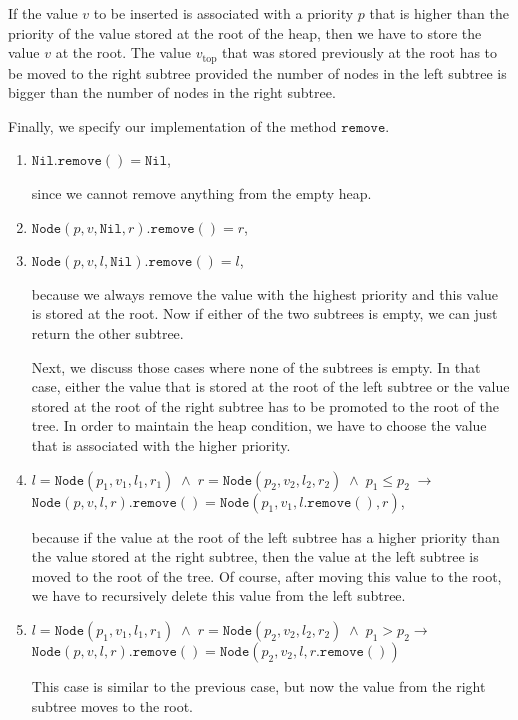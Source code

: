 \begin{enumerate}
      If the value $v$ to be inserted is associated with a priority $p$ that is higher than the priority of
      the value stored at the root of the heap, then we have to store the value $v$ at the root.
      The value $v_\mathrm{top}$ that was stored previously at the root has to be moved to 
      the right subtree provided the number of nodes in the left subtree is bigger than
      the number of nodes in the right subtree.
\end{enumerate}
Finally, we specify our implementation of the method $\texttt{remove}$.
\begin{enumerate}
\item $\texttt{Nil}.\texttt{remove}() = \texttt{Nil}$,

      since we cannot remove anything from the empty heap.
\item $\texttt{Node}(p,v,\texttt{Nil},r).\texttt{remove}() = r$,
  
\item $\texttt{Node}(p,v,l,\texttt{Nil}).\texttt{remove}() = l$,

      because we always remove the value with the highest priority and this value is stored at the
      root.  Now if either of the two subtrees is empty, we can just return the other subtree.

      Next, we discuss those cases where none of the subtrees is empty.
      In that case, either the value that is stored at the root of the left subtree or the value
      stored at the root of the right subtree has to be promoted to the root of the tree.
      In order to maintain the heap condition, we have to choose the value that is associated with the
      higher priority.
\item $l = \texttt{Node}(p_1,v_1,l_1,r_1) \;\wedge\; r = \texttt{Node}(p_2,v_2,l_2,r_2) \;\wedge\; p_1 \leq p_2 \;\rightarrow$ \\[0.1cm] 
      \hspace*{1.3cm} 
      $\texttt{Node}(p,v,l,r).\texttt{remove}() =      \texttt{Node}(p_1,v_1,l.\texttt{remove}(),r)$,

      because if the value at the root of the left subtree has a higher priority than the value
      stored at the right subtree, then the value at the left subtree is moved to the root of the tree.
      Of course, after moving this value to the root, we have to recursively delete this value from
      the left subtree.
\item $l = \texttt{Node}(p_1,v_1,l_1,r_1) \;\wedge\; r = \texttt{Node}(p_2,v_2,l_2,r_2) \;\wedge\; p_1 > p_2 \rightarrow$ \\[0.1cm]
      \hspace*{1.3cm} 
      $\texttt{Node}(p,v,l,r).\texttt{remove}() = \texttt{Node}(p_2,v_2,l,r.\texttt{remove}())$

      This case is similar to the previous case, but now the value from the right subtree moves to
      the root.
\end{enumerate}
